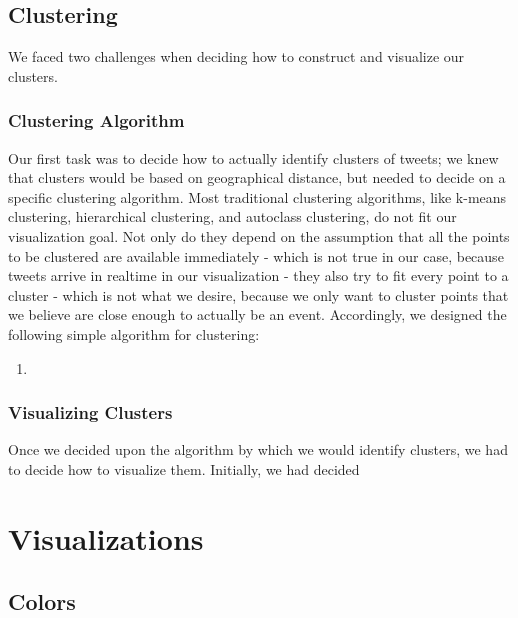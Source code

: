 \documentclass[pdftex,12pt,a4paper]{article}
\begin{document}
\subsection{Clustering}
We faced two challenges when deciding how to construct and visualize our clusters.

\subsubsection{Clustering Algorithm}
Our first task was to decide how to actually identify clusters of tweets; we knew that clusters would be based on geographical distance, but needed to decide on a specific clustering algorithm. Most traditional clustering algorithms, like k-means clustering, hierarchical clustering, and autoclass clustering, do not fit our visualization goal. Not only do they depend on the assumption that all the points to be clustered are available immediately - which is not true in our case, because tweets arrive in realtime in our visualization - they also try to fit every point to a cluster - which is not what we desire, because we only want to cluster points that we believe are close enough to actually be an event. Accordingly, we designed the following simple algorithm for clustering:
\begin{enumerate}
\item
\end{enumerate}

\subsubsection{Visualizing Clusters}
Once we decided upon the algorithm by which we would identify clusters, we had to decide how to visualize them. Initially, we had decided 

\section{Visualizations} 

\subsection{Colors} 
\end{document}
